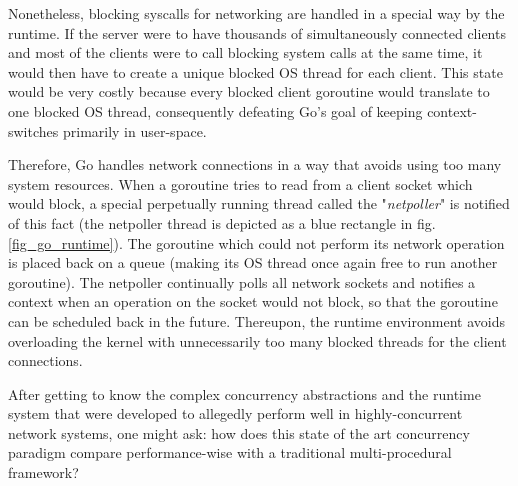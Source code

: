 Nonetheless, blocking syscalls for networking are handled in a special way by the runtime. If the server were to have thousands of simultaneously connected clients and most of the clients were to call blocking system calls at the same time, it would then have to create a unique blocked OS thread for each client. This state would be very costly because every blocked client goroutine would translate to one blocked OS thread, consequently defeating Go's goal of keeping context-switches primarily in user-space.

Therefore, Go handles network connections in a way that avoids using too many system resources. When a goroutine tries to read from a client socket which would block, a special perpetually running thread called the "\textit{netpoller}" is notified of this fact \cite{Morsing2013_2} (the netpoller thread is depicted as a blue rectangle in fig. \ref{fig_go_runtime}). The goroutine which could not perform its network operation is placed back on a queue (making its OS thread once again free to run another goroutine). The netpoller continually polls all network sockets and notifies a context when an operation on the socket would not block, so that the goroutine can be scheduled back in the future. Thereupon, the runtime environment avoids overloading the kernel with unnecessarily too many blocked threads for the client connections.

After getting to know the complex concurrency abstractions and the runtime system that were developed to allegedly perform well in highly-concurrent network systems, one might ask: how does this state of the art concurrency paradigm compare performance-wise with a traditional multi-procedural framework?